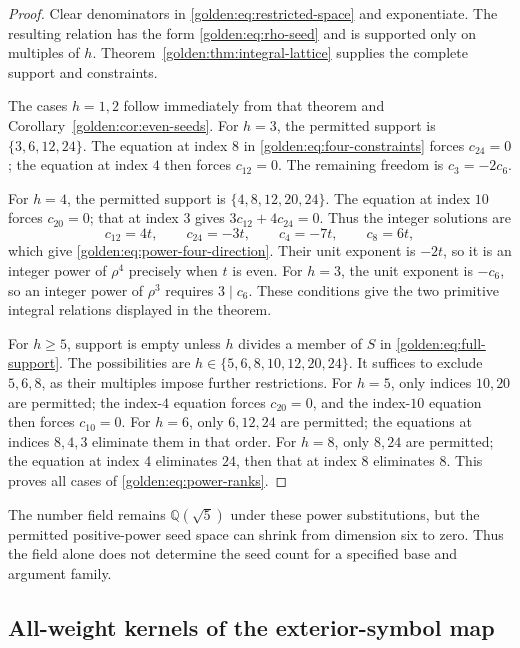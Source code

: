 \begin{proof}
Clear denominators in \eqref{golden:eq:restricted-space} and
exponentiate.  The resulting relation has the form
\eqref{golden:eq:rho-seed} and is supported only on multiples of $h$.
Theorem~\ref{golden:thm:integral-lattice} supplies the complete
support and constraints.

The cases $h=1,2$ follow immediately from that theorem and
Corollary~\ref{golden:cor:even-seeds}.
For $h=3$, the permitted support is $\{3,6,12,24\}$.
The equation at index $8$ in \eqref{golden:eq:four-constraints}
forces $c_{24}=0$; the equation at index $4$ then forces
$c_{12}=0$.  The remaining freedom is $c_3=-2c_6$.

For $h=4$, the permitted support is $\{4,8,12,20,24\}$.
The equation at index $10$ forces $c_{20}=0$; that at index $3$
gives $3c_{12}+4c_{24}=0$.
Thus the integer solutions are
\[
 c_{12}=4t,\qquad c_{24}=-3t,\qquad
 c_4=-7t,\qquad c_8=6t,
\]
which give \eqref{golden:eq:power-four-direction}.
Their unit exponent is $-2t$, so it is an integer power of
$\rho^4$ precisely when $t$ is even.  For $h=3$, the unit
exponent is $-c_6$, so an integer power of $\rho^3$ requires
$3\mid c_6$.  These conditions give the two primitive integral
relations displayed in the theorem.

For $h\ge5$, support is empty unless $h$ divides a member of
$S$ in \eqref{golden:eq:full-support}.  The possibilities are
$h\in\{5,6,8,10,12,20,24\}$.  It suffices to exclude $5,6,8$,
as their multiples impose further restrictions.
For $h=5$, only indices $10,20$ are permitted; the index-$4$
equation forces $c_{20}=0$, and the index-$10$ equation then
forces $c_{10}=0$.
For $h=6$, only $6,12,24$ are permitted; the equations at indices
$8,4,3$ eliminate them in that order.
For $h=8$, only $8,24$ are permitted; the equation at index $4$
eliminates $24$, then that at index $8$ eliminates $8$.
This proves all cases of \eqref{golden:eq:power-ranks}.
\end{proof}

The number field remains $\mathbb Q(\sqrt5)$ under these power
substitutions, but the permitted positive-power seed space can shrink
from dimension six to zero.  Thus the field alone does not determine
the seed count for a specified base and argument family.

\subsection{All-weight kernels of the exterior-symbol map}
\label{golden:subsec:exterior-symbol}

